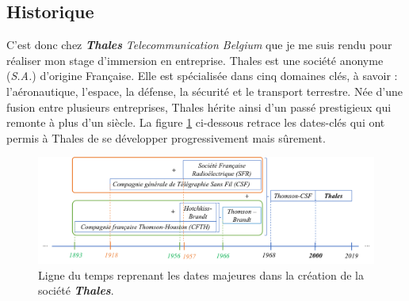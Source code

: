 \documentclass[10pt, oneside, a4paper]{article}
\begin{document}
\subsection{Historique}
C'est donc chez \textbf{\textit{Thales}} \textit{Telecommunication Belgium} que je me suis rendu pour réaliser mon stage d'immersion en entreprise. Thales est une société anonyme (\textit{S.A.}) d'origine Française. Elle est spécialisée dans cinq domaines clés, à savoir : l'aéronautique, l'espace, la défense, la sécurité et le transport terrestre. Née d'une fusion entre plusieurs entreprises, Thales hérite ainsi d’un passé prestigieux qui remonte à plus d’un siècle. La figure \ref{fig:temps} ci-dessous retrace les dates-clés qui ont permis à Thales de se développer progressivement mais sûrement. \\

\begin{figure}[htbp]
    \centering
    \includegraphics[width=1.\textwidth]{image/temps}
    \caption{Ligne du temps reprenant les dates majeures dans la création de la société \textbf{\textit{Thales}}.}
    \label{fig:temps}
\end{figure}
\end{document}
